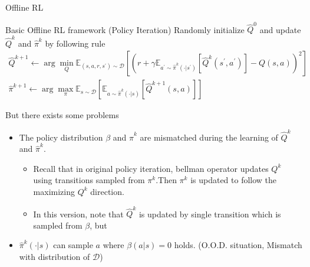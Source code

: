 \documentclass[11pt]{beamer}
\newcommand{\mbb}[1]{\mathbb{#1}}
\newcommand{\mc}[1]{\mathcal{#1}}
\begin{document}
\begin{frame}{Offline RL}
  \begin{block}{Basic Offline RL framework (Policy Iteration)}
    Randomly initialize $\hat{Q}^{0}$ and update $\hat{Q}^k$ and $\hat{\pi}^k$ by following rule
    \[
    \begin{gathered}
      \hat{Q}^{k+1} \leftarrow \arg\min_Q \mbb{E}_{(s,a,r,s^\prime) \sim \mc{D}}\left[\left(r + \gamma \mbb{E}_{a^\prime \sim \hat{\pi}^k (\cdot | s^\prime)}[\hat{Q}^k(s^\prime, a^\prime)]  - Q(s,a)\right)^2\right] \\
      \hat{\pi}^{k+1} \leftarrow \arg\max_\pi \mbb{E}_{s \sim \mc{D}} \left[\mbb{E}_{a \sim \hat{\pi}^k(\cdot|s)} \left[\hat{Q}^{k+1}(s,a)\right]\right]
    \end{gathered}
    \]
  \end{block}
  But there exists some problems
  \begin{itemize}
    \item The policy distribution $\beta$ and $\hat{\pi}^k$ are mismatched during the learning of $\hat{Q}^k$ and $\hat{\pi}^k$.
    \begin{itemize}
      \item Recall that in original policy iteration, bellman operator updates $Q^k$ using transitions sampled from $\pi^k$.Then $\pi^k$ is updated to follow the maximizing $Q^k$ direction.
      \item In this version, note that $\hat{Q}^k$ is updated by single transition which is sampled from $\beta$, but 
    \end{itemize}
    \item $\hat{\pi}^k(\cdot|s)$ can sample $a$ where $\beta(a|s) = 0$ holds. (O.O.D. situation, Mismatch with distribution of $\mc{D}$)
  \end{itemize}
\end{frame}
\end{document}
